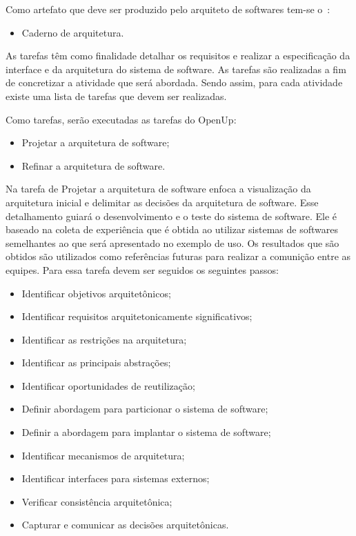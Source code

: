 Como artefato que deve ser produzido pelo arquiteto de softwares tem-se o~\cite{openup}:

\begin{itemize}
    \item Caderno de arquitetura.
\end{itemize}

As tarefas têm como finalidade detalhar os requisitos e realizar a especificação da interface e da arquitetura do sistema de software. As tarefas são realizadas a fim de concretizar a atividade que será abordada. Sendo assim, para cada atividade existe uma lista de tarefas que devem ser realizadas\cite{ISO_1471}. 


Como tarefas, serão executadas as tarefas do \acrfull{OpenUp}:

\begin{itemize}
    \item Projetar a arquitetura de software;
    \item Refinar a arquitetura de software.
\end{itemize}

Na tarefa de Projetar a arquitetura de software enfoca a visualização da arquitetura inicial e delimitar as decisões da arquitetura de software. Esse detalhamento guiará o desenvolvimento e o teste do sistema de software. Ele é baseado na coleta de experiência que é obtida ao utilizar sistemas de softwares semelhantes ao que será apresentado no exemplo de uso. Os resultados que são obtidos são utilizados como referências futuras para realizar a comunição entre as equipes. Para essa tarefa devem ser seguidos os seguintes passos\cite{openup}:

\begin{itemize}
    \item Identificar objetivos arquitetônicos;
    \item Identificar requisitos arquitetonicamente significativos;
    \item Identificar as restrições na arquitetura;
    \item Identificar as principais abstrações;
    \item Identificar oportunidades de reutilização;
    \item Definir abordagem para particionar o sistema de software;
    \item Definir a abordagem para implantar o sistema de software;
    \item Identificar mecanismos de arquitetura;
    \item Identificar interfaces para sistemas externos;
    \item Verificar consistência arquitetônica;
    \item Capturar e comunicar as decisões arquitetônicas.
\end{itemize}

